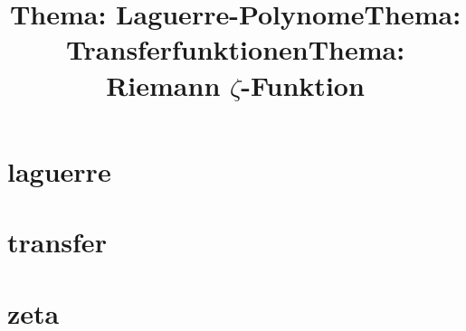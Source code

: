 \title[laguerre]{Thema: Laguerre-Polynome}
\section{laguerre}
\titel


\title[transfer]{Thema: Transferfunktionen}
\section{transfer}
\titel


\title[zeta]{Thema: Riemann $\zeta$-Funktion}
\section{zeta}
\titel



